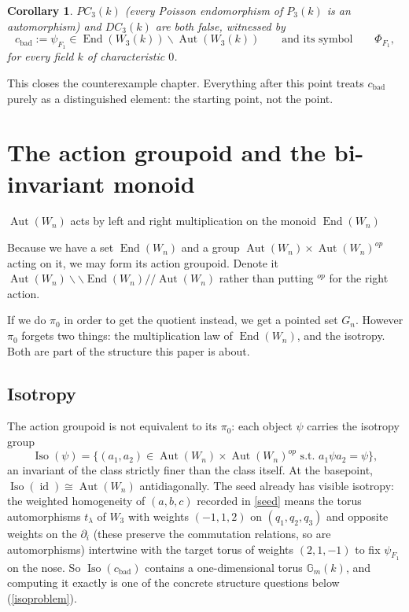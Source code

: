 \documentclass[11pt]{article}
\theoremstyle{change}
\newtheorem{cor}[equation]{Corollary}
\theoremstyle{nonumberplain}
\numberwithin{equation}{section}
\newcommand\sminus{\smallsetminus}
\newcommand\st{{\textrm{ s.t.\ }}}
\newcommand\setof[1]{\{ #1 \}}
\DeclareMathOperator{\End}{End}
\DeclareMathOperator{\Aut}{Aut}
\DeclareMathOperator{\Iso}{Iso}
\DeclareMathOperator{\id}{id}
\begin{document}
\begin{cor}
$PC_3(k)$ (every Poisson endomorphism of $P_3(k)$ is an automorphism) and $DC_3(k)$ are both false, witnessed by
\begin{equation*}
c_{\text{bad}} := \psi_{F_1} \in \End(W_3(k)) \sminus \Aut(W_3(k)) \qquad \text{and its symbol} \qquad \Phi_{F_1},
\end{equation*}
for every field $k$ of characteristic $0$.
\end{cor}

This closes the counterexample chapter. Everything after this point treats $c_{\text{bad}}$ purely as a distinguished element: the starting point, not the point.

\section{The action groupoid and the bi-invariant monoid\label{monoid}}

$\Aut(W_n)$ acts by left and right multiplication on the monoid $\End(W_n)$

Because we have a set $\End(W_n)$ and a group $\Aut(W_n) \times \Aut(W_n)^{op}$ acting on it, we may form its action groupoid. Denote it $\Aut(W_n) \backslash \backslash \End(W_n) / / \Aut(W_n)$ rather than putting $^{op}$ for the right action.

If we do $\pi_0$ in order to get the quotient instead, we get a pointed set $G_n$. However $\pi_0$ forgets two things: the multiplication law of $\End (W_n)$, and the isotropy. Both are part of the structure this paper is about.

\subsection{Isotropy\label{isotropy}}

The action groupoid is not equivalent to its $\pi_0$: each object $\psi$ carries the isotropy group
\begin{equation*}
\Iso(\psi) = \setof{ (a_1, a_2) \in \Aut(W_n) \times \Aut(W_n)^{op} \st a_1 \psi a_2 = \psi },
\end{equation*}
an invariant of the class strictly finer than the class itself. At the basepoint, $\Iso(\id) \cong \Aut(W_n)$ antidiagonally. The seed already has visible isotropy: the weighted homogeneity of $(a,b,c)$ recorded in \cref{seed} means the torus automorphisms $t_\lambda$ of $W_3$ with weights $(-1,1,2)$ on $(q_1,q_2,q_3)$ and opposite weights on the $\partial_i$ (these preserve the commutation relations, so are automorphisms) intertwine with the target torus of weights $(2,1,-1)$ to fix $\psi_{F_1}$ on the nose. So $\Iso(c_{\text{bad}})$ contains a one-dimensional torus $\mathbb{G}_m(k)$, and computing it exactly is one of the concrete structure questions below (\cref{isoproblem}).
\end{document}
